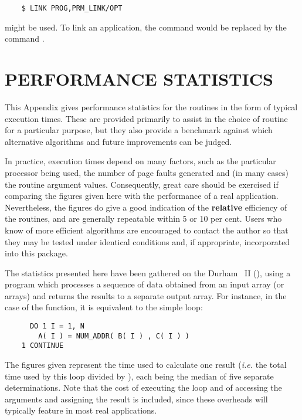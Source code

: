 \begin{verbatim}
    $ LINK PROG,PRM_LINK/OPT
\end{verbatim}

might be used.
To link an  application, the  command would be
replaced by the  command . 

\appendix

\newpage

\section{PERFORMANCE STATISTICS}

\label{appendix:statistics}

This Appendix gives performance statistics for the  routines
in the form of typical execution times. 
These are provided primarily to assist in the choice of routine for a 
particular purpose, but they also provide a benchmark against which 
alternative algorithms and future improvements can be judged.

In practice, execution times depend on many factors, such as the
particular processor being used, the number of page faults generated
and (in many cases) the routine argument values.
Consequently, great care should be exercised if comparing the figures given
here with the performance of a real application.
Nevertheless, the figures do give a good indication of the {\bf relative}
efficiency of the routines, and are generally repeatable within 5 or 10 per
cent. 
Users who know of more efficient algorithms are encouraged to contact the
author so that they may be tested under identical conditions and, if
appropriate, incorporated into this package. 

The statistics presented here have been gathered on the Durham
~II (), using a program which processes a
sequence of data obtained from an input array (or arrays) and returns the
results to a separate output array. 
For instance, in the case of the  function, it is equivalent 
to the simple loop:

\begin{verbatim}
      DO 1 I = 1, N
        A( I ) = NUM_ADDR( B( I ) , C( I ) )
    1 CONTINUE
\end{verbatim}

The figures given represent the  time used to calculate one result
({\em i.e.} the total  time used by this loop divided by
), each being the median of five separate determinations. 
Note that the cost of executing the loop and of accessing the arguments and
assigning the result is included, since these overheads will typically
feature in most real applications. 

